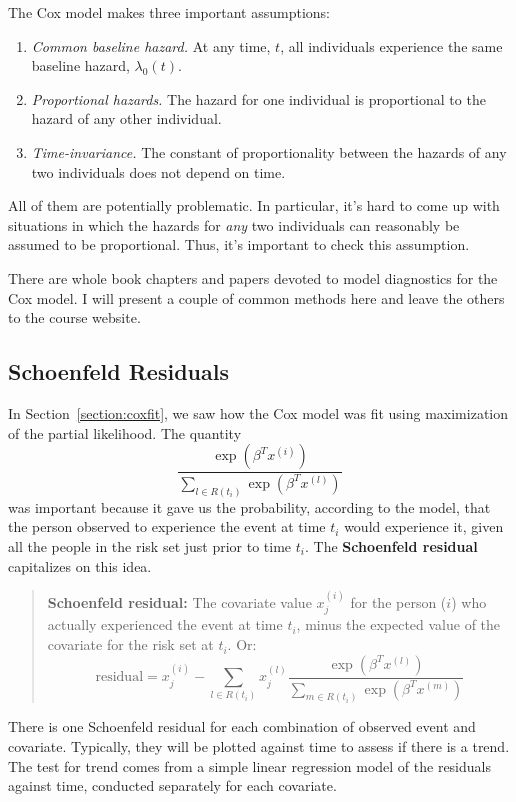 The Cox model makes three important assumptions:
\begin{enumerate}
\item \emph{Common baseline hazard.} At any time, $t$, all individuals experience the same baseline hazard, $\lambda_0(t)$. 
\item \emph{Proportional hazards.} The hazard for one individual is proportional to the hazard of any other individual.
\item \emph{Time-invariance.} The constant of proportionality between the hazards of any two individuals does not depend on time. 
\end{enumerate}
All of them are potentially problematic. In particular, it's hard to come up with situations in which the hazards for \emph{any} two individuals can reasonably be assumed to be proportional. Thus, it's important to check this assumption. 

There are whole book chapters and papers devoted to model diagnostics for the Cox model. I will present a couple of common methods here and leave the others to the course website. 

\subsection{Schoenfeld Residuals}

In Section~\ref{section:coxfit}, we saw how the Cox model was fit using maximization of the partial likelihood. The quantity
$$ \frac{\exp(\beta^Tx^{(i)})}{\sum_{l \in R(t_i)} \exp( \beta^Tx^{(l)})} $$ 
was important because it gave us the probability, according to the model, that the person observed to experience the event at time $t_i$ would experience it, given all the people in the risk set just prior to time $t_i$. The \textbf{Schoenfeld residual} capitalizes on this idea.

\begin{quote}
\textbf{Schoenfeld residual:} The covariate value $x_j^{(i)}$ for the person ($i$) who actually experienced the event at time $t_i$, minus the expected value of the covariate for the risk set at $t_i$. Or:
$$ \text{residual} = x_j^{(i)} - \sum_{l \in R(t_i)} x_j^{(l)} \frac{\exp(\beta^Tx^{(l)})}{\sum_{m \in R(t_i)} \exp( \beta^Tx^{(m)})} $$
\end{quote}

There is one Schoenfeld residual for each combination of observed event and covariate. Typically, they will be plotted against time to assess if there is a trend. The test for trend comes from a simple linear regression model of the residuals against time, conducted separately for each covariate. 

